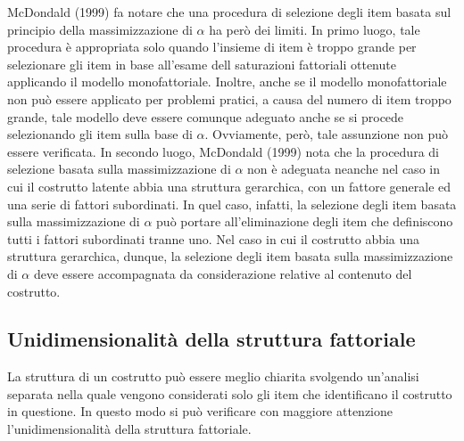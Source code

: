 McDondald (1999) fa notare che una procedura di selezione degli item basata sul principio della  massimizzazione di $\alpha$ ha però dei limiti.  In primo luogo, tale procedura è appropriata solo quando l'insieme di item è troppo
 grande per selezionare gli item in base all'esame dell saturazioni fattoriali ottenute applicando il modello
 monofattoriale. 
Inoltre, anche se il modello monofattoriale non può essere applicato per problemi pratici, a causa del numero di item troppo grande, tale modello deve essere comunque adeguato anche se si procede selezionando gli item sulla base di $\alpha$. Ovviamente, però, tale assunzione non può essere verificata.
In secondo luogo, McDondald (1999) nota che la procedura di selezione basata sulla massimizzazione di $\alpha$ non è adeguata neanche nel caso in cui il costrutto latente abbia una struttura gerarchica, con un fattore generale ed una serie di fattori subordinati.  In quel caso, infatti, la selezione degli item basata sulla massimizzazione di $\alpha$ può portare all'eliminazione degli item che definiscono tutti i fattori subordinati tranne uno. Nel caso in cui il costrutto abbia una struttura gerarchica, dunque,  la selezione degli item basata sulla  massimizzazione di $\alpha$  deve essere accompagnata da considerazione relative al contenuto del costrutto. 





\subsection{Unidimensionalità della struttura fattoriale}

La struttura di un costrutto può essere meglio chiarita svolgendo un'analisi separata nella quale vengono considerati solo gli item che identificano il costrutto in questione. In questo modo si può verificare con maggiore attenzione l'unidimensionalità della struttura fattoriale.  

